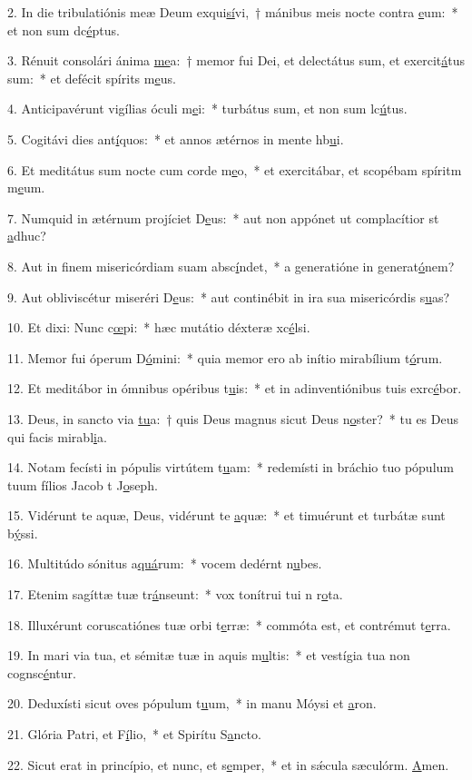 2. In die tribulatiónis meæ Deum exqui\uline{sí}vi,~† mánibus meis nocte contra \uline{e}um:~* et non sum dc\uline{é}ptus.\par 
3. Rénuit consolári ánima \uline{me}a:~† memor fui Dei, et delectátus sum, et exercit\uline{á}tus sum:~* et defécit spírits m\uline{e}us.\par 
4. Anticipavérunt vigílias óculi m\uline{e}i:~* turbátus sum, et non sum lc\uline{ú}tus.\par 
5. Cogitávi dies ant\uline{í}quos:~* et annos ætérnos in mente hb\uline{u}i.\par 
6. Et meditátus sum nocte cum corde m\uline{e}o,~* et exercitábar, et scopébam spíritm m\uline{e}um.\par 
7. Numquid in ætérnum projíciet D\uline{e}us:~* aut non appónet ut complacítior st \uline{a}dhuc?\par 
8. Aut in finem misericórdiam suam absc\uline{í}ndet,~* a generatióne in generat\uline{ó}nem?\par 
9. Aut obliviscétur miseréri D\uline{e}us:~* aut continébit in ira sua misericórdis s\uline{u}as?\par 
10. Et dixi: Nunc c\uline{œ}pi:~* hæc mutátio déxteræ xc\uline{é}lsi.\par 
11. Memor fui óperum D\uline{ó}mini:~* quia memor ero ab inítio mirabílium t\uline{ó}rum.\par 
12. Et meditábor in ómnibus opéribus t\uline{u}is:~* et in adinventiónibus tuis exrc\uline{é}bor.\par 
13. Deus, in sancto via \uline{tu}a:~† quis Deus magnus sicut Deus n\uline{o}ster?~* tu es Deus qui facis mirabl\uline{i}a.\par 
14. Notam fecísti in pópulis virtútem t\uline{u}am:~* redemísti in bráchio tuo pópulum tuum fílios Jacob t J\uline{o}seph.\par 
15. Vidérunt te aquæ, Deus, vidérunt te \uline{a}quæ:~* et timuérunt et turbátæ sunt b\uline{ý}ssi.\par 
16. Multitúdo sónitus a\uline{quá}rum:~* vocem dedérnt n\uline{u}bes.\par 
17. Etenim sagíttæ tuæ tr\uline{á}nseunt:~* vox tonítrui tui n r\uline{o}ta.\par 
18. Illuxérunt coruscatiónes tuæ orbi t\uline{e}rræ:~* commóta est, et contrémut t\uline{e}rra.\par 
19. In mari via tua, et sémitæ tuæ in aquis m\uline{u}ltis:~* et vestígia tua non cognsc\uline{é}ntur.\par 
20. Deduxísti sicut oves pópulum t\uline{u}um,~* in manu Móysi et \uline{a}ron.\par 
21. Glória Patri, et F\uline{í}lio,~* et Spirítu S\uline{a}ncto.\par 
22. Sicut erat in princípio, et nunc, et s\uline{e}mper,~* et in sǽcula sæculórm. \uline{A}men.\par 
